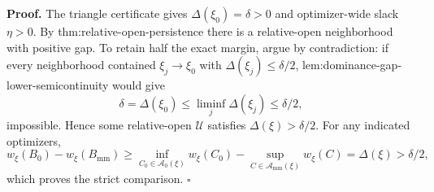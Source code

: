\textbf{Proof.}
The triangle certificate gives \(\Delta(\xi_0)=\delta>0\) and optimizer-wide slack \(\eta>0\).  By thm:relative-open-persistence there is a relative-open neighborhood with positive gap.  To retain half the exact margin, argue by contradiction: if every neighborhood contained \(\xi_j\to\xi_0\) with \(\Delta(\xi_j)\le\delta/2\), lem:dominance-gap-lower-semicontinuity would give
\[
 \delta=\Delta(\xi_0)\le\liminf_j\Delta(\xi_j)\le\delta/2,
\]
impossible.  Hence some relative-open \(\mathcal U\) satisfies \(\Delta(\xi)>\delta/2\).  For any indicated optimizers,
\[
 w_\xi(B_0)-w_\xi(B_{\mathrm{mm}})
 \ge\inf_{C_0\in\mathcal A_0(\xi)}w_\xi(C_0)
 -\sup_{C\in\mathcal A_{\mathrm{mm}}(\xi)}w_\xi(C)
 =\Delta(\xi)>\delta/2,
\]
which proves the strict comparison. \(\square\)
